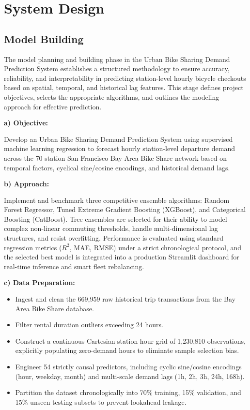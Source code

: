 \documentclass[12pt, a4paper]{article}
\renewcommand{\_}{\textunderscore\allowbreak}
\begin{document}
\clearpage

\section{System Design}

\subsection{Model Building}
The model planning and building phase in the Urban Bike Sharing Demand Prediction System establishes a structured methodology to ensure accuracy, reliability, and interpretability in predicting station-level hourly bicycle checkouts based on spatial, temporal, and historical lag features. This stage defines project objectives, selects the appropriate algorithms, and outlines the modeling approach for effective prediction.

\noindent \textbf{a) Objective:}

Develop an Urban Bike Sharing Demand Prediction System using supervised machine learning regression to forecast hourly station-level departure demand across the 70-station San Francisco Bay Area Bike Share network based on temporal factors, cyclical sine/cosine encodings, and historical demand lags.

\noindent \textbf{b) Approach:}

Implement and benchmark three competitive ensemble algorithms: Random Forest Regressor, Tuned Extreme Gradient Boosting (XGBoost), and Categorical Boosting (CatBoost). Tree ensembles are selected for their ability to model complex non-linear commuting thresholds, handle multi-dimensional lag structures, and resist overfitting. Performance is evaluated using standard regression metrics ($R^2$, MAE, RMSE) under a strict chronological protocol, and the selected best model is integrated into a production Streamlit dashboard for real-time inference and smart fleet rebalancing.

\noindent \textbf{c) Data Preparation:}
\begin{itemize}
    \item Ingest and clean the 669,959 raw historical trip transactions from the Bay Area Bike Share database.
    \item Filter rental duration outliers exceeding 24 hours.
    \item Construct a continuous Cartesian station-hour grid of 1,230,810 observations, explicitly populating zero-demand hours to eliminate sample selection bias.
    \item Engineer 54 strictly causal predictors, including cyclic sine/cosine encodings (hour, weekday, month) and multi-scale demand lags (1h, 2h, 3h, 24h, 168h).
    \item Partition the dataset chronologically into 70\% training, 15\% validation, and 15\% unseen testing subsets to prevent lookahead leakage.
\end{itemize}
\end{document}
